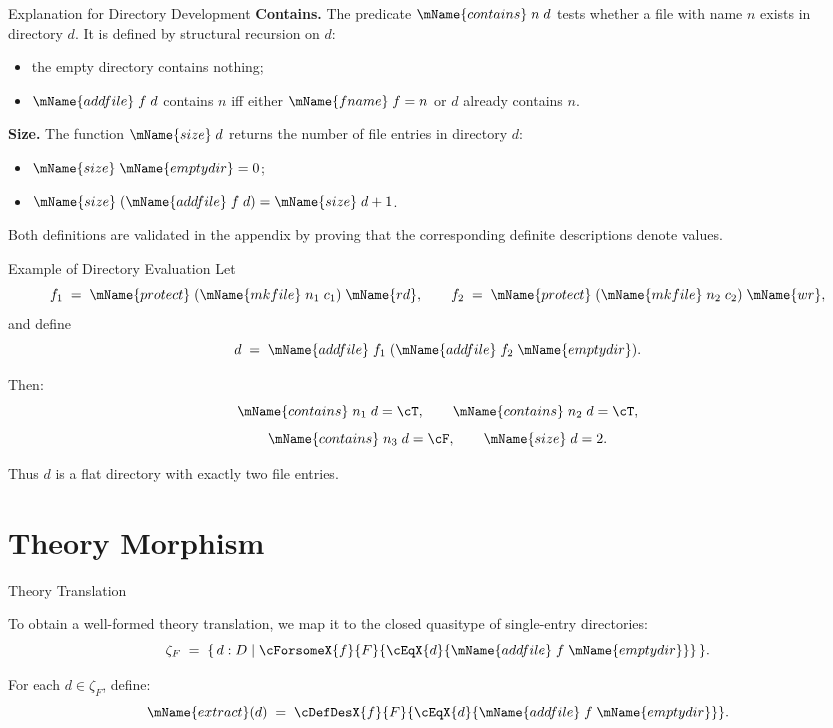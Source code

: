 \documentclass[aspectratio=169]{beamer}
\newcommand{\mkfile}{\mName{mkfile}}
\newcommand{\fname}{\mName{fname}}
\newcommand{\prot}{\mName{protect}}
\begin{document}
\begin{frame}{Explanation for Directory Development}
\small
\textbf{Contains.}
The predicate $\mName{contains}\;n\;d$ tests whether a file with
name $n$ exists in directory $d$. It is defined by structural
recursion on $d$:
\begin{itemize}
  \item the empty directory contains nothing;
  \item $\mName{addfile}\;f\;d$ contains $n$ iff either
  $\fname\;f = n$ or $d$ already contains $n$.
\end{itemize}

\medskip
\textbf{Size.}
The function $\mName{size}\;d$ returns the number of file entries
in directory $d$:
\begin{itemize}
  \item $\mName{size}\;\mName{emptydir} = 0$;
  \item $\mName{size}\;(\mName{addfile}\;f\;d) = \mName{size}\;d + 1$.
\end{itemize}

\medskip
Both definitions are validated in the appendix by proving that the
corresponding definite descriptions denote values.
\end{frame}

\begin{frame}{Example of Directory Evaluation}
\small
Let
\[
f_1 \;=\; \prot\;(\mkfile\;n_1\;c_1)\;\mName{rd},
\qquad
f_2 \;=\; \prot\;(\mkfile\;n_2\;c_2)\;\mName{wr},
\]
and define
\[
d \;=\; \mName{addfile}\;f_1\;(\mName{addfile}\;f_2\;\mName{emptydir}).
\]

Then:
\[
\mName{contains}\;n_1\;d = \cT,
\qquad
\mName{contains}\;n_2\;d = \cT,
\]
\[
\mName{contains}\;n_3\;d = \cF,
\qquad
\mName{size}\;d = 2.
\]

\medskip
Thus $d$ is a flat directory with exactly two file entries.
\end{frame}

\section{Theory Morphism}

\begin{frame}[fragile]{Theory Translation}
\small

To obtain a well-formed theory translation, we map
it to the closed quasitype of single-entry directories:
\[
  \zeta_F \;=\;
  \{\, d : D \mid \cForsomeX{f}{F}{
      \cEqX{d}{\mName{addfile}\;f\;\mName{emptydir}}}\,\}.
\]

\medskip

For each $d \in \zeta_F$, define:
\[
  \mName{extract}(d) \;=\;
  \cDefDesX{f}{F}{
    \cEqX{d}{\mName{addfile}\;f\;\mName{emptydir}}}.
\]

\medskip

\end{frame}
\end{document}
